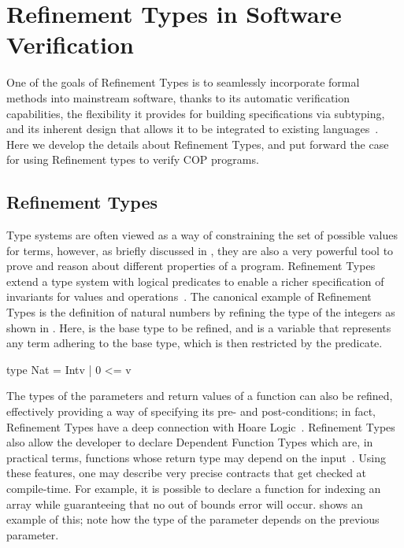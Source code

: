 

\section{Refinement Types in Software Verification}
\label{sec:state-of-the-art}

One of the goals of Refinement Types is to seamlessly incorporate formal methods 
into mainstream software, thanks to its automatic verification capabilities, the flexibility it provides 
for building specifications via subtyping, and its inherent design that allows it to be integrated to 
existing languages~\cite{jhala21}. 
Here we develop the details about Refinement Types, and put forward the case for using Refinement 
types to verify \ac{COP} programs. 


\subsection{Refinement Types}
\label{sec:refinement-types}

Type systems are often viewed as a way of constraining the set of possible values for terms, however, 
as briefly discussed in , they are also a very powerful tool to prove and reason about 
different properties of a program. Refinement Types extend a type system with logical predicates to 
enable a richer specification of invariants for values and operations~\cite{jhala21}.
The canonical example of Refinement Types is the definition of natural numbers by refining the type of 
the integers as shown in . Here,  is the base type 
to be refined, and  is a variable that represents any term adhering to the base type, which is 
then restricted by the  predicate.

\begin{scala}[numbers=none,label=lst:refinement-nat-example, caption=Natural numbers definition by refining integers with Refinement Types]
  type Nat = Int{v | 0 <= v}
\end{scala}

The types of the parameters and return values of a function can also be refined, effectively providing a 
way of specifying its pre- and post-conditions; in fact, 
Refinement Types have a deep connection with Hoare Logic~\cite{chen22}. Refinement Types also 
allow the developer to declare Dependent Function Types which are, in practical terms, functions 
whose return type may depend on the input~\cite{rijke22}. Using these features, one may describe very 
precise contracts that get checked at compile-time. For example, it is possible to declare a function for 
indexing an array while guaranteeing that no out of bounds error will occur.  
shows an example of this; note how the type of the  parameter depends on the previous 
 parameter.

